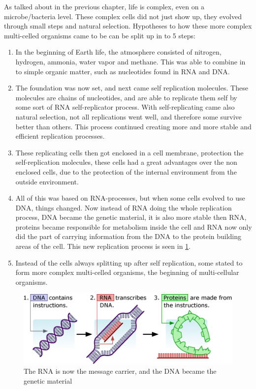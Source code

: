 As talked about in the previous chapter, life is complex, even on a microbe/bacteria level. These complex cells did not just show up, they evolved through small steps and natural selection. Hypotheses to how these more complex multi-celled organisms came to be can be split up in to 5 steps:
\begin{enumerate}
  \item In the beginning of Earth life, the atmosphere consisted of nitrogen, hydrogen, ammonia, water vapor and methane. This was able to combine in to simple organic matter, such as nucleotides found in RNA and DNA.
  \item The foundation was now set, and next came self replication molecules. These molecules are chains of nucleotides, and are able to replicate them self by some sort of RNA self-replicator process. With self-replicating came also natural selection, not all replications went well, and therefore some survive better than others. This process continued creating more and more stable and efficient replication processes.
  \item These replicating cells then got enclosed in a cell membrane, protection the self-replication molecules, these cells had a great advantages over the non enclosed cells, due to the protection of the internal environment from the outside environment.
  \item All of this was based on RNA-processes, but when some cells evolved to use DNA, things changed. Now instead of RNA doing the whole replication process, DNA became the genetic material, it is also more stable then RNA, proteins became responsible for metabolism inside the cell and RNA now only did the part of carrying information from the DNA to the protein building areas of the cell. This new replication process is seen in \ref{fig:RNAtoDNA}.
  \item Instead of the cells always splitting up after self replication, some stated to form more complex multi-celled organisms, the beginning of multi-cellular organisms.
\end{enumerate}
\begin{figure}[htb]
  \centering
  \includegraphics[width=\textwidth]{figures/Life/dnarnaprotein}
  \caption{The RNA is now the message carrier, and the DNA became the genetic material}
  \label{fig:RNAtoDNA}
\end{figure}
